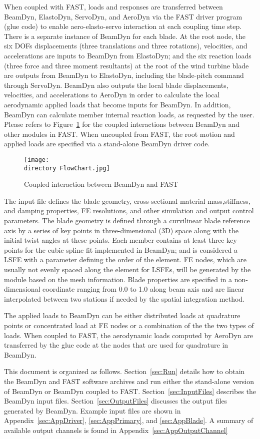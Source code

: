 When coupled with FAST, loads and responses are transferred between BeamDyn, ElastoDyn, ServoDyn, and AeroDyn via the FAST driver program (glue code) to enable aero-elasto-servo interaction at each coupling time step. There is a separate instance of BeamDyn for each blade. At the root node, the six DOFs displacements (three translations and three rotations), velocities, and accelerations are inputs to BeamDyn from ElastoDyn; and the six reaction loads (three force and three moment resultants) at the root of the wind turbine blade are outputs from BeamDyn to ElastoDyn, including the blade-pitch command through ServoDyn. BeamDyn also outputs the local blade displacements, velocities, and accelerations to AeroDyn in order to calculate the local aerodynamic applied loads that become inputs for BeamDyn. In addition, BeamDyn can calculate member internal reaction loads, as requested by the user. Please refers to Figure~\ref{fig:FlowChart} for the coupled interactions between BeamDyn and other modules in FAST. When uncoupled from FAST, the root motion and applied loads are specified via a stand-alone BeamDyn driver code.
\begin{figure}
    \centering
    \texttt{[image: \\directory FlowChart.jpg]}
    \caption{Coupled interaction between BeamDyn and FAST}
    \label{fig:FlowChart}
\end{figure}

The input file defines the blade geometry, cross-sectional material mass,stiffness, and damping properties, FE resolutions, and other simulation and output control parameters. The blade geometry is defined through a curvilinear blade reference axis by a series of key points in three-dimensional (3D) space along with the initial twist angles at these points. Each member contains at least three key points for the cubic spline fit implemented in BeamDyn; and is considered a LSFE with a parameter defining the order of the element. FE nodes, which are usually not evenly spaced along the element for LSFEs, will be generated by the module based on the mesh information. Blade properties are specified in a non-dimensional coordinate ranging from 0.0 to 1.0 along beam axis and are linear interpolated between two stations if needed  by the spatial integration method. 

The applied loads to BeamDyn can be either distributed loads at quadrature points or concentrated load at FE nodes or a combination of the the two types of loads.  When coupled to FAST, the aerodynamic loads computed by AeroDyn are transferred by the glue code at the nodes that are used for quadrature in BeamDyn.

This document is organized as follows. Section~\ref{sec:Run} details how to obtain the BeamDyn and FAST software archives and run either the stand-alone version of BeamDyn or BeamDyn coupled to FAST. Section~\ref{sec:InputFiles} describes the BeamDyn input files. Section~\ref{sec:OutputFiles} discusses the output files generated by BeamDyn. Example input files are shown in Appendix~\ref{sec:AppDriver}, \ref{sec:AppPrimary}, and  \ref{sec:AppBlade}. A summary of available output channels is found in Appendix~\ref{sec:AppOutputChannel}
